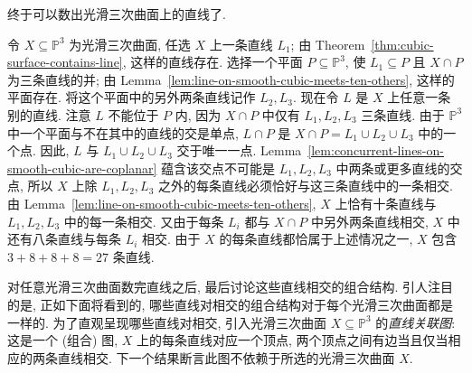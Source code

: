 终于可以数出光滑三次曲面上的直线了.

\begingroup
\renewcommand{\AJProofBegin}{%
  \par\addvspace{\topsep}\noindent
  {\sffamily\bfseries\CJKfamily{pffont}Proof of Theorem~\ref{thm:smooth-cubic-surface-has-twenty-seven-lines}}\enspace\ignorespaces
}
\begin{Proof}
令 $X\subseteq\mathbb{P}^{3}$ 为光滑三次曲面, 任选 $X$ 上一条直线 $L_{1}$; 由 Theorem~\ref{thm:cubic-surface-contains-line}, 这样的直线存在. 选择一个平面 $P\subseteq\mathbb{P}^{3}$, 使 $L_{1}\subseteq P$ 且 $X\cap P$ 为三条直线的并; 由 Lemma~\ref{lem:line-on-smooth-cubic-meets-ten-others}, 这样的平面存在. 将这个平面中的另外两条直线记作 $L_{2},L_{3}$. 现在令 $L$ 是 $X$ 上任意一条别的直线. 注意 $L$ 不能位于 $P$ 内, 因为 $X\cap P$ 中仅有 $L_{1},L_{2},L_{3}$ 三条直线. 由于 $\mathbb{P}^{3}$ 中一个平面与不在其中的直线的交是单点, $L\cap P$ 是 $X\cap P=L_{1}\cup L_{2}\cup L_{3}$ 中的一个点. 因此, $L$ 与 $L_{1}\cup L_{2}\cup L_{3}$ 交于唯一一点. Lemma~\ref{lem:concurrent-lines-on-smooth-cubic-are-coplanar} 蕴含该交点不可能是 $L_{1},L_{2},L_{3}$ 中两条或更多直线的交点, 所以 $X$ 上除 $L_{1},L_{2},L_{3}$ 之外的每条直线必须恰好与这三条直线中的一条相交. 由 Lemma~\ref{lem:line-on-smooth-cubic-meets-ten-others}, $X$ 上恰有十条直线与 $L_{1},L_{2},L_{3}$ 中的每一条相交. 又由于每条 $L_{i}$ 都与 $X\cap P$ 中另外两条直线相交, $X$ 中还有八条直线与每条 $L_{i}$ 相交. 由于 $X$ 的每条直线都恰属于上述情况之一, $X$ 包含 $3+8+8+8=27$ 条直线.
\end{Proof}
\endgroup

对任意光滑三次曲面数完直线之后, 最后讨论这些直线相交的组合结构. 引人注目的是, 正如下面将看到的, 哪些直线对相交的组合结构对于每个光滑三次曲面都是一样的. 为了直观呈现哪些直线对相交, 引入光滑三次曲面 $X\subseteq\mathbb{P}^{3}$ 的\emph{直线关联图}: 这是一个 (组合) 图, $X$ 上的每条直线对应一个顶点, 两个顶点之间有边当且仅当相应的两条直线相交. 下一个结果断言此图不依赖于所选的光滑三次曲面 $X$.

